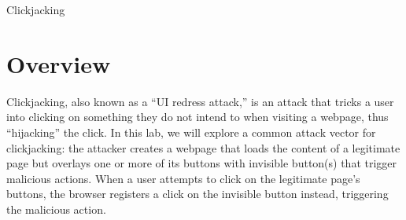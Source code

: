 
\newcommand{\commonfolder}{../../common-files}
\newcommand{\webcommon}{../Web_Common}






\begin{center}
{\LARGE Clickjacking}
\end{center}

\vspace{0.1in}
\vspace{0.1in}

\section{Overview}

Clickjacking, also known as a ``UI redress attack,'' is an attack that
tricks a user into clicking on something they do not intend to when
visiting a webpage, thus ``hijacking'' the click. In this lab, we will
explore a common attack vector for clickjacking: the attacker creates a
webpage that loads the content of a legitimate page but overlays one or
more of its buttons with invisible button(s) that trigger malicious
actions.  When a user attempts to click on the legitimate page's
buttons, the browser registers a click on the invisible button instead,
triggering the malicious action.

